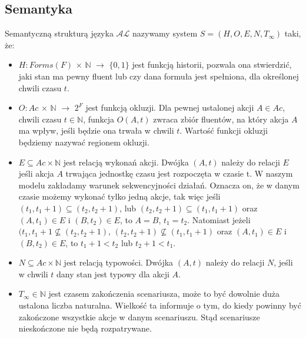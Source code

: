 \subsection{Semantyka}
\begin{definition}
Semantyczną strukturą języka $\mathcal{AL}$ nazywamy system $ S=(H,O,E,N,T_{\infty }) $ taki, że:
	\begin{itemize}
		\item $ H: Forms(F) $ $\times$ $ \mathbb{N}$ $\longrightarrow$ $\{0,1\}$ jest funkcją historii, pozwala ona stwierdzić, jaki stan ma pewny fluent lub czy dana formuła jest spełniona, dla określonej chwili czasu $t$.
		\item $ O: Ac$ $\times$ $ \mathbb{N}$ $\longrightarrow$ $2^{F}$ jest funkcją okluzji. Dla pewnej ustalonej akcji $A \in Ac$, chwili czasu $t\in\mathbb{N}$, funkcja $O(A,t) $ zwraca zbiór fluentów, na który akcja $A$ ma wpływ, jeśli będzie ona trwała w chwili $t$. 
Wartość funkcji okluzji będziemy nazywać regionem okluzji. 
		\item $E\subseteq Ac \times \mathbb{N}$ jest relacją wykonań akcji. Dwójka $(A,t)$ należy do relacji $E$ jeśli akcja $A$ trwająca jednostkę czasu jest rozpoczęta w czasie t. W naszym modelu zakładamy warunek sekwencyjności działań. Oznacza on, że w danym czasie możemy wykonać tylko jedną akcje, tak więc jeśli $(t_{1},t_{1} + 1) \subseteq (t_{2},t_{2}+1)$, lub $(t_{2},t_{2}+1 ) \subseteq (t_{1},t_{1}+1) $ oraz $(A,t_{1})\in E$ i $(B,t_{2})\in E$, to $A=B$, $t_{1}=t_{2}$. Natomiast jeżeli $(t_{1},t_{1}+1 \nsubseteq (t_{2},t_{2}+1 )$, $(t_{2},t_{2}+1 ) \nsubseteq (t_{1},t_{1}+1) $ oraz $(A,t_{1})\in E$ i $(B,t_{2})\in E$, to $t_{1}+1<t_{2}$ lub $t_{2}+1<t_{1}$.
		\item $N\subseteq Ac \times \mathbb{N}$ jest relacją typowości. 
		Dwójka $(A,t)$ należy do relacji $N$, jeśli w chwili $t$ dany stan jest typowy dla akcji $A$. 
		\item $T_{\infty } \in \mathbb{N} $ jest czasem zakończenia scenariusza, może to być dowolnie duża ustalona liczba naturalna. 
		Wielkość ta informuje o tym, do kiedy powinny być zakończone wszystkie akcje w danym scenariuszu. Stąd scenariusze nieskończone nie będą rozpatrywane. 
	\end{itemize}
\end{definition}


